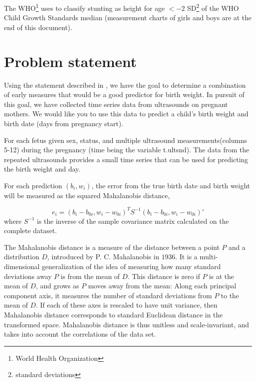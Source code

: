 \documentclass[10pt,twocolumn,letterpaper]{article}
\begin{document}
The WHO\footnote{World Health Organization} uses to classify stunting as height for age $< -2$ SD\footnote{standard deviations} of the WHO Child Growth Standards median (measurement charts of girls and boys are at the end of this document).

\section{Problem statement}


Using the statement described in \cite{topcoder}, we have the goal to determine a combination of early measures that would be a good predictor for birth weight. In pursuit of this goal, we have collected time series data from ultrasounds on pregnant mothers. We would like you to use this data to predict a child’s birth weight and birth date (days from pregnancy start).

For each fetus given sex, status, and multiple ultrasound measurements(columns 5-12) during the pregnancy (time being the variable t.ultsnd). The data from the repeated ultrasounds provides a small time series that can be used for predicting the birth weight and day.

For each prediction $(b_i, w_i)$, the error from the true birth date and birth weight will be measured as the squared Mahalanobis distance,

\begin{equation}
e_i = (b_i - b_{0i}, w_i - w_{0i})^TS^{-1}(b_i - b_{0i}, w_i - w_{0i})'
\label{eq:Mahalanobis}
\end{equation}
where $S^{-1}$ is the inverse of the sample covariance matrix calculated on the complete dataset.

The Mahalanobis distance is a measure of the distance between a point $P$ and a distribution $D$, introduced by P. C. Mahalanobis in $1936$\cite{Mahalanobis}. It is a multi-dimensional generalization of the idea of measuring how many standard deviations away $P$ is from the mean of $D$. This distance is zero if $P$ is at the mean of $D$, and grows as $P$ moves away from the mean: Along each principal component axis, it measures the number of standard deviations from $P$ to the mean of $D$. If each of these axes is rescaled to have unit variance, then Mahalanobis distance corresponds to standard Euclidean distance in the transformed space. Mahalanobis distance is thus unitless and scale-invariant, and takes into account the correlations of the data set.
\end{document}
